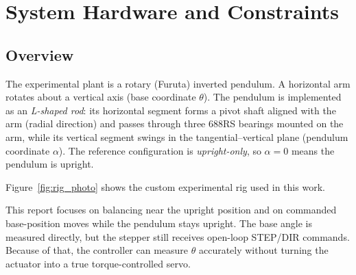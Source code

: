 \chapter{System Hardware and Constraints}
\label{ch:hardware}

\section{Overview}
The experimental plant is a rotary (Furuta) inverted pendulum. A horizontal arm rotates about a vertical axis (base coordinate $\theta$). The pendulum is implemented as an \emph{L-shaped rod}: its horizontal segment forms a pivot shaft aligned with the arm (radial direction) and passes through three 688RS bearings mounted on the arm, while its vertical segment swings in the tangential--vertical plane (pendulum coordinate $\alpha$). The reference configuration is \emph{upright-only}, so $\alpha=0$ means the pendulum is upright.

Figure~\ref{fig:rig_photo} shows the custom experimental rig used in this work.


This report focuses on balancing near the upright position and on commanded base-position moves while the pendulum stays upright. The base angle is measured directly, but the stepper still receives open-loop STEP/DIR commands. Because of that, the controller can measure $\theta$ accurately without turning the actuator into a true torque-controlled servo.

